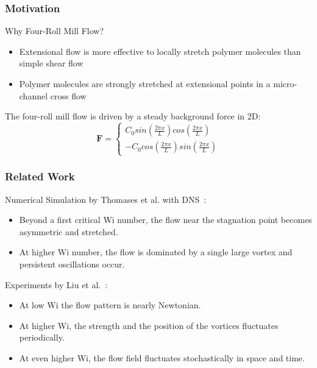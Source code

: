 \begin{frame}
  \frametitle{Motivation}

  \begin{block}{Why Four-Roll Mill Flow?}
    \begin{itemize}
    \item Extensional flow is more effective to locally 
      stretch polymer molecules than simple shear flow
    \item Polymer molecules are strongly stretched at extensional points in a micro-channel cross flow
    \end{itemize}

  \end{block}
  The four-roll mill flow is driven by a steady background force in 2D:
  \begin{equation}
    \mathbf{F}=\left\{\begin{matrix}
        C_0sin(\frac{2\pi x} {L})cos(\frac{2\pi x} {L})
        \\ 
        -C_0cos(\frac{2\pi x} {L})sin(\frac{2\pi x} {L})
      \end{matrix}\right.
  \end{equation}
\end{frame}

\begin{frame}
  \frametitle{Related Work}
\begin{block}{Numerical Simulation by Thomases et al. with DNS~\footnotemark: }
\begin{itemize}
 \item Beyond a first critical Wi number, the flow near the stagnation point becomes asymmetric and stretched.
\item At higher Wi number, the flow is dominated by a single large vortex and persistent oscillations occur. 
\end{itemize}
\end{block}
\begin{block}{Experiments by Liu et al.~\footnotemark[2]:}
\begin{itemize}
 \item  At low Wi the flow pattern is nearly Newtonian. 
\item At higher Wi, the strength and the position of the vortices fluctuates periodically.
\item At even higher Wi, the flow field fluctuates stochastically in space and time.
\end{itemize}
\end{block}
\end{frame}

